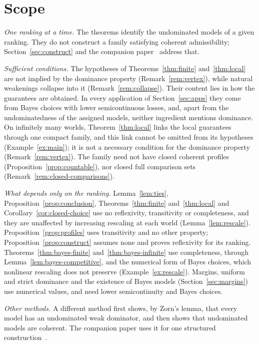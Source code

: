 \documentclass[11pt]{article}
\theoremstyle{definition}
\theoremstyle{remark}
\begin{document}
\section{Scope}\label{sec:scope}
\emph{One ranking at a time.} The theorems identify the undominated models of a given ranking. They do not construct a family satisfying coherent admissibility; Section~\ref{sec:construct} and the companion paper~\cite{KCM} address that.

\emph{Sufficient conditions.} The hypotheses of Theorems~\ref{thm:finite} and~\ref{thm:local} are not implied by the dominance property (Remark~\ref{rem:vertex}), while natural weakenings collapse into it (Remark~\ref{rem:collapse}). Their content lies in how the guarantees are obtained. In every application of Section~\ref{sec:apps} they come from Bayes choices with lower semicontinuous losses, and, apart from the undominatedness of the assigned models, neither ingredient mentions dominance. On infinitely many worlds, Theorem~\ref{thm:local} links the local guarantees through one compact family, and this link cannot be omitted from its hypotheses (Example~\ref{ex:main}); it is not a necessary condition for the dominance property (Remark~\ref{rem:vertex}). The family need not have closed coherent profiles (Proposition~\ref{prop:countable}), nor closed full comparison sets (Remark~\ref{rem:closed-comparisons}).

\emph{What depends only on the ranking.} Lemma~\ref{lem:ties}, Proposition~\ref{prop:conclusion}, Theorems~\ref{thm:finite} and~\ref{thm:local} and Corollary~\ref{cor:closed-choice} use no reflexivity, transitivity or completeness, and they are unaffected by increasing rescaling at each world (Lemma~\ref{lem:rescale}). Proposition~\ref{prop:profiles} uses transitivity and no other property; Proposition~\ref{prop:construct} assumes none and proves reflexivity for its ranking. Theorems~\ref{thm:bayes-finite} and~\ref{thm:bayes-infinite} use completeness, through Lemma~\ref{lem:bayes-competitive}, and the numerical form of Bayes choices, which nonlinear rescaling does not preserve (Example~\ref{ex:rescale}). Margins, uniform and strict dominance and the existence of Bayes models (Section~\ref{sec:margins}) use numerical values, and need lower semicontinuity and Bayes choices.

\emph{Other methods.} A different method first shows, by Zorn's lemma, that every model has an undominated weak dominator, and then shows that undominated models are coherent. The companion paper uses it for one structured construction~\cite{KCM}.
\end{document}
